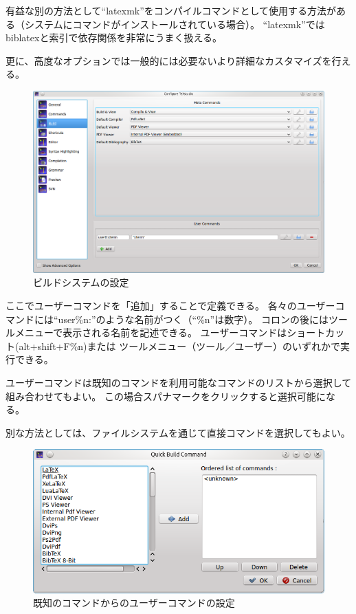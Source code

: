 有益な別の方法として``latexmk''をコンパイルコマンドとして使用する方法がある（システムにコマンドがインストールされている場合）。
``latexmk''ではbiblatexと索引で依存関係を非常にうまく扱える。

更に、高度なオプションでは一般的には必要ないより詳細なカスタマイズを行える。

\begin{figure}[H]
  \centering
  \includegraphics[width=.8\linewidth]{configure_build.png}
  \caption{ビルドシステムの設定}
\end{figure}

ここでユーザーコマンドを「追加」することで定義できる。
各々のユーザーコマンドには``user\%n:''のような名前がつく（``\%n''は数字）。
コロンの後にはツールメニューで表示される名前を記述できる。
ユーザーコマンドはショートカット(alt+shift+F\%n)または
ツールメニュー（ツール／ユーザー）のいずれかで実行できる。

ユーザーコマンドは既知のコマンドを利用可能なコマンドのリストから選択して組み合わせてもよい。
この場合スパナマークをクリックすると選択可能になる。

別な方法としては、ファイルシステムを通じて直接コマンドを選択してもよい。

\begin{figure}[H]
  \centering
  \includegraphics{doc21.png}
  \caption{既知のコマンドからのユーザーコマンドの設定}
\end{figure}

